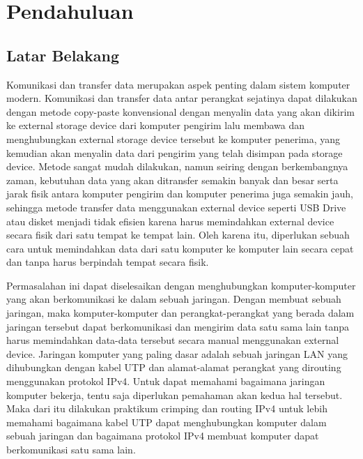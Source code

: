 \section{Pendahuluan}
\subsection{Latar Belakang}
Komunikasi dan transfer data merupakan aspek penting dalam sistem komputer modern. Komunikasi dan transfer data antar perangkat sejatinya dapat dilakukan dengan metode copy-paste konvensional dengan menyalin data yang akan dikirim ke external storage device dari komputer pengirim lalu membawa dan menghubungkan external storage device tersebut ke komputer penerima, yang kemudian akan menyalin data dari pengirim yang telah disimpan pada storage device. Metode sangat mudah dilakukan, namun seiring dengan berkembangnya zaman, kebutuhan data yang akan ditransfer semakin banyak dan besar serta jarak fisik antara komputer pengirim dan komputer penerima juga semakin jauh, sehingga metode transfer data menggunakan external device seperti USB Drive atau disket menjadi tidak efisien karena harus memindahkan external device secara fisik dari satu tempat ke tempat lain. Oleh karena itu, diperlukan sebuah cara untuk memindahkan data dari satu komputer ke komputer lain secara cepat dan tanpa harus berpindah tempat secara fisik. 

Permasalahan ini dapat diselesaikan dengan menghubungkan komputer-komputer yang akan berkomunikasi ke dalam sebuah jaringan. Dengan membuat sebuah jaringan, maka komputer-komputer dan perangkat-perangkat yang berada dalam jaringan tersebut dapat berkomunikasi dan mengirim data satu sama lain tanpa harus memindahkan data-data tersebut secara manual menggunakan external device. Jaringan komputer yang paling dasar adalah sebuah jaringan LAN yang dihubungkan dengan kabel UTP dan alamat-alamat perangkat yang dirouting menggunakan protokol IPv4. Untuk dapat memahami bagaimana jaringan komputer bekerja, tentu saja diperlukan pemahaman akan kedua hal tersebut. Maka dari itu dilakukan praktikum crimping dan routing IPv4 untuk lebih memahami bagaimana kabel UTP dapat menghubungkan komputer dalam sebuah jaringan dan bagaimana protokol IPv4 membuat komputer dapat berkomunikasi satu sama lain.

